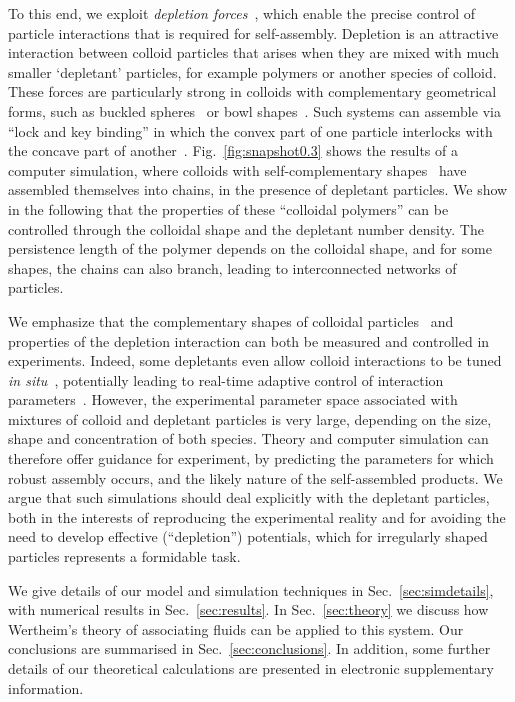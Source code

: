 \documentclass[8.5pt,oneside,onecolumn]{article}
\begin{document}
To this end, we exploit {\em depletion
  forces}~\cite{Lekkerkerker:2011}, which enable the precise control
of particle interactions that is required for self-assembly.
Depletion is an attractive interaction between colloid particles that
arises when they are mixed with much smaller `depletant' particles,
for example polymers or another species of colloid.  These forces are
particularly strong in colloids with complementary geometrical forms,
such as buckled spheres~\cite{Sacanna:2010ys} or bowl
shapes~\cite{marechal2010}.  Such systems can assemble via ``lock and
key binding'' in which the convex part of one particle interlocks with
the concave part of
another~\cite{Konig2008,Sacanna:2010ys,Odriozola08-13}.
Fig.~\ref{fig:snapshot0.3} shows the results of a computer simulation,
where colloids with self-complementary shapes~\cite{Sacanna:2010ys} have assembled
themselves into chains, in the presence of depletant particles.  We
show in the following that the properties of these ``colloidal
polymers'' can be controlled through the colloidal shape and the
depletant number density.  The persistence length of the polymer
depends on the colloidal shape, and for some shapes, the chains can
also branch, leading to interconnected networks of particles.

We emphasize that the complementary shapes of colloidal particles~\cite{Sacanna:2010ys,Sacanna2011,Bahadur2012} and
properties of the depletion interaction can both be measured and controlled
in experiments.  Indeed, some depletants even allow colloid
interactions to be tuned \emph{in
situ}~\cite{Alsayed04,Savage09,Rossi11}, potentially leading to
real-time adaptive control of interaction
parameters~\cite{Klotsa:2013vn}.  However, the experimental parameter
space associated with mixtures of colloid and depletant particles is
very large, depending on the size, shape and concentration of both
species.  Theory and computer simulation can therefore offer
guidance for experiment, by predicting the parameters for which robust
assembly occurs, and the likely nature of the self-assembled products.
We argue that such simulations should deal explicitly with the
depletant particles, both in the interests of reproducing the
experimental reality and for avoiding the need to develop effective
(``depletion'') potentials, which for irregularly shaped particles
represents a formidable task.

We give details of our model and simulation techniques in Sec.~\ref{sec:simdetails},
with numerical results in Sec.~\ref{sec:results}.  In Sec.~\ref{sec:theory} we discuss
how Wertheim's theory of associating fluids can be applied to this system.  Our
conclusions are summarised in Sec.~\ref{sec:conclusions}.  In addition, some further
details of our theoretical calculations are presented in electronic supplementary information.
\end{document}
